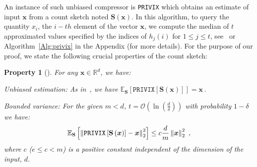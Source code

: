 \documentclass[11pt]{article}
\newtheorem{property}{Property}
\begin{document}
An instance of such unbiased compressor is \texttt{PRIVIX} which obtains an estimate of input $\boldsymbol{x}$ from a count sketch noted $\boldsymbol{S}(\boldsymbol{x})$. 
In this algorithm, to query the quantity $x_i$, the $i-th$ element of the vector $\boldsymbol{x}$, we compute the median of $t$ approximated values specified by the indices of $h_j(i)$ for $1\leq j\leq t$, see~\citep{li2019privacy} or Algorithm~\ref{Alg:privix} in the Appendix (for more details).
For the purpose of our proof, we state the following crucial properties of the count sketch:
\begin{property}[\citet{li2019privacy}]
For any $\boldsymbol{x}\in \mathbb{R}^{d}$, we have:

\textit{Unbiased estimation}: As in~\citet{li2019privacy}, we have $ \mathbb{E}_{\mathbf{S}}\left[\texttt{PRIVIX}\left[\mathbf{S}\left(\boldsymbol{x}\right)\right]\right]=\boldsymbol{x}\, $.

\textit{Bounded variance:} For the given $m<d$, $t=\mathcal{O}\left(\ln \left(\frac{d}{\delta}\right)\right)$ with probability $1-\delta$ we have:
    \begin{align}\notag
        \mathbb{E}_{\mathbf{S}}\left[\left\|\texttt{PRIVIX}\left[\mathbf{S}\left(\boldsymbol{x}\right)\right]-\boldsymbol{x}\right\|_2^2\right] \leq c\frac{d}{m}\left\|\boldsymbol{x}\right\|_2^2\ , 
    \end{align}
 where $c$ ($e\leq c<m$) is a positive constant independent of the dimension of the input, $d$.
\end{property}
\end{document}
